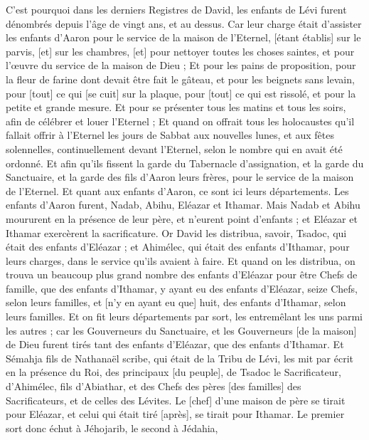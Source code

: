 \begin{multicols}{2}
C'est pourquoi dans les derniers Registres de David, les enfants de Lévi furent dénombrés depuis l'âge de vingt ans, et au dessus.
Car leur charge était d'assister les enfants d'Aaron pour le service de la maison de l'Eternel, [étant établis] sur le parvis, [et] sur les chambres, [et] pour nettoyer toutes les choses saintes, et pour l'œuvre du service de la maison de Dieu ;
Et pour les pains de proposition, pour la fleur de farine dont devait être fait le gâteau, et pour les beignets sans levain, pour [tout] ce qui [se cuit] sur la plaque, pour [tout] ce qui est rissolé, et pour la petite et grande mesure.
Et pour se présenter tous les matins et tous les soirs, afin de célébrer et louer l'Eternel ;
Et quand on offrait tous les holocaustes qu'il fallait offrir à l'Eternel les jours de Sabbat aux nouvelles lunes, et aux fêtes solennelles, continuellement devant l'Eternel, selon le nombre qui en avait été ordonné.
Et afin qu'ils fissent la garde du Tabernacle d'assignation, et la garde du Sanctuaire, et la garde des fils d'Aaron leurs frères, pour le service de la maison de l'Eternel.
\VerseOne{}Et quant aux enfants d'Aaron, ce sont ici leurs départements. Les enfants d'Aaron furent, Nadab, Abihu, Eléazar et Ithamar.
Mais Nadab et Abihu moururent en la présence de leur père, et n'eurent point d'enfants ; et Eléazar et Ithamar exercèrent la sacrificature.
Or David les distribua, savoir, Tsadoc, qui était des enfants d'Eléazar ; et Ahimélec, qui était des enfants d'Ithamar, pour leurs charges, dans le service qu'ils avaient à faire.
Et quand on les distribua, on trouva un beaucoup plus grand nombre des enfants d'Eléazar pour être Chefs de famille, que des enfants d'Ithamar, y ayant eu des enfants d'Eléazar, seize Chefs, selon leurs familles, et [n'y en ayant eu que] huit, des enfants d'Ithamar, selon leurs familles.
Et on fit leurs départements par sort, les entremêlant les uns parmi les autres ; car les Gouverneurs du Sanctuaire, et les Gouverneurs [de la maison] de Dieu furent tirés tant des enfants d'Eléazar, que des enfants d'Ithamar.
Et Sémahja fils de Nathanaël scribe, qui était de la Tribu de Lévi, les mit par écrit en la présence du Roi, des principaux [du peuple], de Tsadoc le Sacrificateur, d'Ahimélec, fils d'Abiathar, et des Chefs des pères [des familles] des Sacrificateurs, et de celles des Lévites. Le [chef] d'une maison de père se tirait pour Eléazar, et celui qui était tiré [après], se tirait pour Ithamar.
Le premier sort donc échut à Jéhojarib, le second à Jédahia,

\end{multicols}
